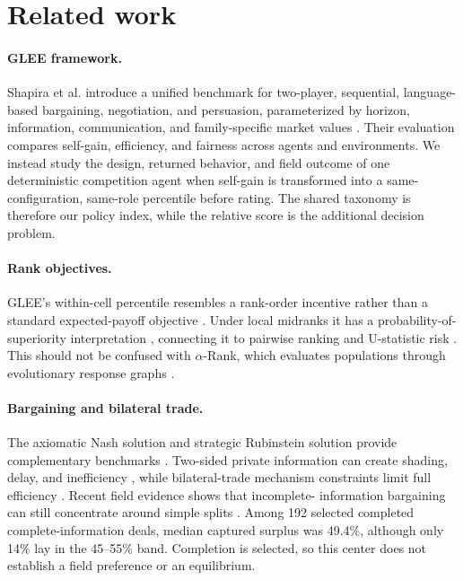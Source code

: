 \section{Related work}
\label{app:related}

\paragraph{GLEE framework.}
Shapira et al. introduce a unified benchmark for two-player, sequential,
language-based bargaining, negotiation, and persuasion, parameterized by
horizon, information, communication, and family-specific market values
\citep{shapira2024glee}. Their evaluation compares self-gain, efficiency, and
fairness across agents and environments. We instead study the design, returned
behavior, and field outcome of one deterministic competition agent when
self-gain is transformed into a same-configuration, same-role percentile before
rating. The shared taxonomy is therefore our policy index, while the relative
score is the additional decision problem.

\paragraph{Rank objectives.}
GLEE's within-cell percentile resembles a rank-order incentive rather than a
standard expected-payoff objective \citep{lazear1981tournaments}. Under local
midranks it has a probability-of-superiority interpretation
\citep{mann1947test}, connecting it to pairwise ranking and U-statistic risk
\citep{clemencon2008ranking}. This should not be confused with $\alpha$-Rank,
which evaluates populations through evolutionary response graphs
\citep{omidshafiei2019alpharank}.

\paragraph{Bargaining and bilateral trade.}
The axiomatic Nash solution and strategic Rubinstein solution provide
complementary benchmarks
\citep{nash1950bargaining,rubinstein1982,binmore1986nash}. Two-sided private
information can create shading, delay, and inefficiency
\citep{chatterjee1983incomplete,chatterjee1987twosided,admati1987delay}, while
bilateral-trade mechanism constraints limit full efficiency
\citep{myerson1983bilateral}. Recent field evidence shows that incomplete-
information bargaining can still concentrate around simple splits
\citep{keniston2024splitting}. Among 192 selected completed
complete-information deals, median captured surplus was 49.4\%, although only
14\% lay in the 45--55\% band. Completion is selected, so this center does not
establish a field preference or an equilibrium.

